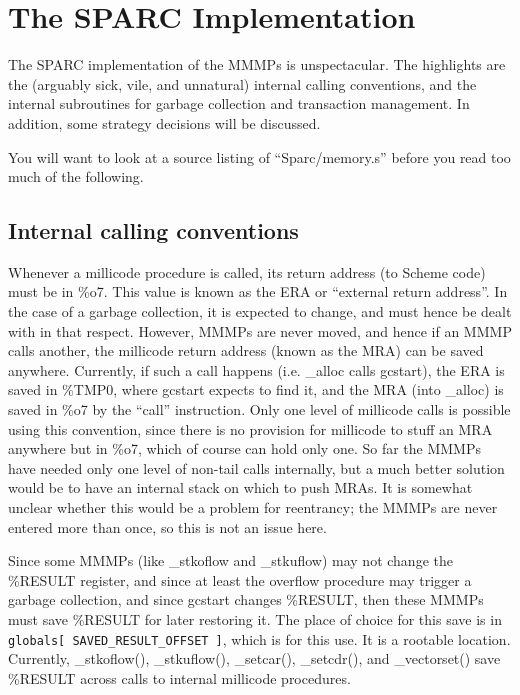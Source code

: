 \section{The SPARC Implementation}

The SPARC implementation of the MMMPs is unspectacular. The highlights
are the (arguably sick, vile, and unnatural) internal calling
conventions, and the internal subroutines for garbage collection and
transaction management. In addition, some strategy decisions will be
discussed.

You will want to look at a source listing of ``Sparc/memory.s'' before you
read too much of the following.


\subsection{Internal calling conventions}

Whenever a millicode procedure is called, its return address (to
Scheme code) must be in \%o7. This value is known as the ERA or
``external return address''. In the case of a garbage collection, it is
expected to change, and must hence be dealt with in that respect.
However, MMMPs are never moved, and hence if an MMMP calls another,
the millicode return address (known as the MRA) can be saved anywhere.
Currently, if such a call happens (i.e. \_alloc calls gcstart), the ERA
is saved in \%TMP0, where gcstart expects to find it, and the MRA (into
\_alloc) is saved in \%o7 by the ``call'' instruction. Only one level of
millicode calls is possible using this convention, since there is no
provision for millicode to stuff an MRA anywhere but in \%o7, which of
course can hold only one. So far the MMMPs have needed only one level
of non-tail calls internally, but a much better solution would be to
have an internal stack on which to push MRAs. It is somewhat unclear
whether this would be a problem for reentrancy; the MMMPs are never
entered more than once, so this is not an issue here.

Since some MMMPs (like \_stkoflow and \_stkuflow) may not change the
{\sc \%RESULT} register, and since at least the overflow procedure may
trigger a garbage collection, and since gcstart changes {\sc \%RESULT}, then
these MMMPs must save {\sc \%RESULT} for later restoring it. The place of
choice for this save is in \verb+globals[ SAVED_RESULT_OFFSET ]+, which is
for this use. It is a rootable location. Currently, \_stkoflow(),
\_stkuflow(), \_setcar(), \_setcdr(), and \_vectorset() save {\sc \%RESULT} 
across calls
to internal millicode procedures.


